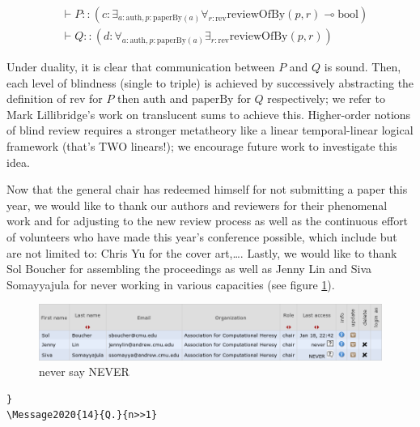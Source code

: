 \documentclass[12pt]{article}
\newcommand{\auth}{\text{auth}}
\newcommand{\paperby}{\text{paperBy}}
\newcommand{\reviewofby}{\text{reviewOfBy}}
\newcommand{\bool}{\text{bool}}
\newcommand{\rev}{\text{rev}}
\begin{document}
\begin{align*}
&\vdash P::(c:\exists_{a:\auth,p:\paperby(a)}\forall_{r:\rev}\reviewofby(p, r)\multimap\bool)\\
&\vdash Q::(d:\forall_{a:\auth,p:\paperby(a)}\exists_{r:\rev}\reviewofby(p, r))
\end{align*}

Under duality, it is clear that communication between $P$ and $Q$ is sound. Then, each level of blindness (single to triple) is achieved by successively abstracting the definition of $\rev$ for $P$ then $\auth$ and $\paperby$ for $Q$ respectively; we refer to Mark Lillibridge's work on translucent sums to achieve this. Higher-order notions of blind review requires a stronger metatheory like a linear temporal-linear logical framework (that’s TWO linears!); we encourage future work to investigate this idea.

Now that the general chair has redeemed himself for not submitting a paper this year, we would like to thank our authors and reviewers for their phenomenal work and for adjusting to the new review process as well as the continuous effort of volunteers who have made this year’s conference possible, which include but are not limited to: Chris Yu for the cover art,\ldots. Lastly, we would like to thank Sol Boucher for assembling the proceedings as well as Jenny Lin and Siva Somayyajula for never working in various capacities (see figure \ref{fig:never}).

\begin{figure}
\centering
\includegraphics[width=\textwidth]{never.png}
\caption{never say NEVER}
\label{fig:never}
\end{figure}

\begin{verbatim}
}
\Message2020{14}{Q.}{n>>1}
\end{verbatim}

\thispagestyle{empty}
\end{document}
